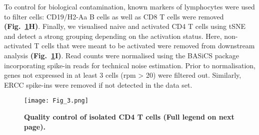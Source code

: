 To control for biological contamination, known markers of lymphocytes were used to filter cells: CD19\plus{}/H2-Aa\plus{} B cells as well as CD8\plus{} T cells were removed \textbf{(Fig.~\ref{fig1:QC}H)}. Finally, we visualised naive and activated CD4\plus{} T cells using \gls{tSNE} and detect a strong grouping depending on the activation status. Here, non-activated T cells that were meant to be activated were removed from downstream analysis \textbf{(Fig.~\ref{fig1:QC}I)}. Read counts were normalised using the BASiCS package \citep{Vallejos2015} incorporating spike-in reads for technical noise estimation. Prior to normalisation, genes not expressed in at least 3 cells (rpm > 20) were filtered out. Similarly, ERCC spike-ins were removed if not detected in the data set.

\newpage

\begin{figure}[!hb]
\centering
\texttt{[image: Fig\_3.png]}
\caption[Quality control of isolated CD4\plus{} T cells]{\textbf{Quality control of isolated CD4\plus{} T cells (Full legend on next page).}\\}
\label{fig1:QC}
\end{figure}

\newpage

